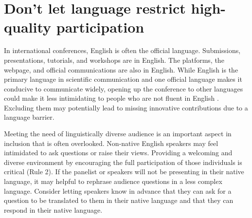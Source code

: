 \documentclass[10pt,letterpaper]{article}
\begin{document}



\section{Don't let language restrict high-quality participation}
\label{rule_language}

In international conferences, English is often the official language. Submissions, presentations, tutorials, and workshops are in English. The platforms, the webpage, and official communications are also in English. While English is the primary language in scientific communication and one official language makes it conducive to communicate widely, opening up the conference to other languages could make it less intimidating to people who are not fluent in English \cite{ninerBetterWhomLeveling2021}. Excluding them may potentially lead to missing innovative contributions due to a language barrier. 

Meeting the need 
of linguistically diverse audience is an important aspect in inclusion that is often overlooked. Non-native English speakers may feel intimidated to ask questions or raise their views. Providing a welcoming and diverse environment by encouraging the full participation of those individuals is critical (Rule 2). If the panelist or speakers will not be presenting in their native language, it may helpful to rephrase audience questions in a less complex language. Consider letting speakers know in advance that they can ask for a question to be translated to them in their native language and that they can respond in their native language.
\end{document}
